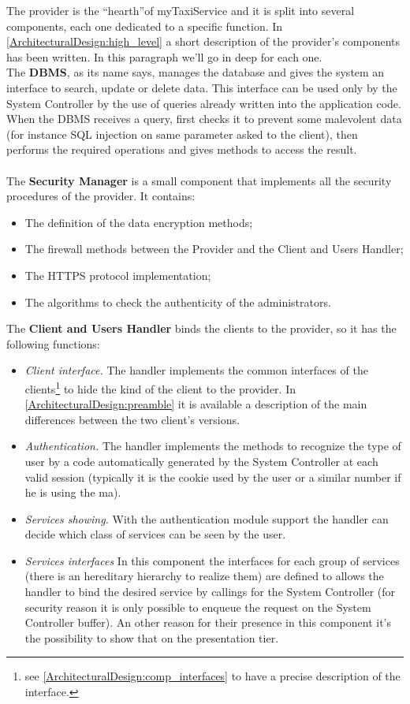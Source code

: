 \documentclass[\mainpath/main]{subfiles}
\begin{document}
The provider is the \textquotedblleft hearth\textquotedblright of myTaxiService and it is split into several components, each one dedicated to a specific function. In \autoref{ArchitecturalDesign:high_level} a short description of the provider's components has been written. In this paragraph we'll go in deep for each one.\\
The \textbf{DBMS}, as its name says, manages the database and gives the system an interface to search, update or delete data. This interface can be used only by the System Controller by the use of queries already written into the application code. When the DBMS receives a query, first checks it to prevent some malevolent data (for instance SQL injection on same parameter asked to the client), then performs the required operations and gives methods to access the result.\\
\\
The \textbf{Security Manager} is a small component that implements all the security procedures of the provider. It contains:
\begin{itemize}
	\item The definition of the data encryption methods;
	\item The firewall methods between the Provider and the Client and Users Handler;
	\item The HTTPS protocol implementation;
	\item The algorithms to check the authenticity of the administrators. \\
\end{itemize}

The \textbf{Client and Users Handler} binds the clients to the provider, so it has the following functions:
\begin{itemize}
	\item \textit{Client interface.} The handler implements the common interfaces of the clients\footnote{see \autoref{ArchitecturalDesign:comp_interfaces} to have a precise description of the interface.} to hide the kind of the client to the provider. In \autoref{ArchitecturalDesign:preamble} it is available a description of the main differences between the two client's versions.
	\item \textit{Authentication.} The handler implements the methods to recognize the type of user by a code automatically generated by the System Controller at each valid session (typically it is the cookie used by the user or a similar number if he is using the \gls{ma}).
	\item \textit{Services showing.} With the authentication module support the handler can decide which class of services can be seen by the user.
	\item \textit{Services interfaces} In this component the interfaces for each group of services (there is an hereditary hierarchy to realize them) are defined to allows the handler to bind the desired service by callings for the System Controller (for security reason it is only possible to enqueue the request on the System Controller buffer). An other reason for their presence in this component it's the possibility to show that on the presentation tier.\\
\end{itemize}
\end{document}
